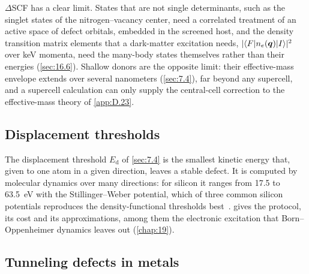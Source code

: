 $\Delta$SCF has a clear limit. States that are not single determinants, such as the singlet states of the nitrogen--vacancy center, need a correlated treatment of an active space of defect orbitals, embedded in the screened host, and the density transition matrix elements that a dark-matter excitation needs, $|\langle F|n_e(\bm{q})|I\rangle|^2$ over keV momenta, need the many-body states themselves rather than their energies (\cref{sec:16.6}). Shallow donors are the opposite limit: their effective-mass envelope extends over several nanometers (\cref{sec:7.4}), far beyond any supercell, and a supercell calculation can only supply the central-cell correction to the effective-mass theory of \cref{app:D.23}.

\subsection{Displacement thresholds}

The displacement threshold $E_{\mathrm{d}}$ of \cref{sec:7.4} is the smallest kinetic energy that, given to one atom in a given direction, leaves a stable defect. It is computed by molecular dynamics over many directions: for silicon it ranges from 17.5 to \SI{63.5}{eV} with the Stillinger--Weber potential, which of three common silicon potentials reproduces the density-functional thresholds best~\cite{kadribasic2018directional}.  gives the protocol, its cost and its approximations, among them the electronic excitation that Born--Oppenheimer dynamics leaves out (\cref{chap:19}).

\subsection{Tunneling defects in metals}

